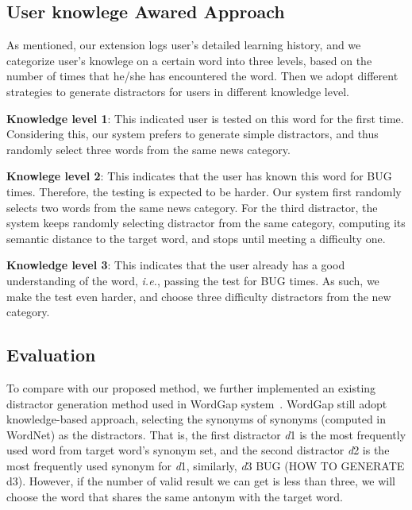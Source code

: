\subsection{User knowlege Awared Approach}
As mentioned, our extension logs user's detailed learning history, and we categorize user's knowlege  on a certain word into three levels, based on the number of times that he/she has encountered  the word.  Then we adopt different strategies to generate  distractors for users in different knowledge level. 



{\bf Knowledge level 1}: This indicated user is tested on this word for the first time. Considering this, our system prefers to generate simple distractors, and thus randomly select three words from the same news category. 

{\bf Knowlege level 2}: This indicates that the user has known this word for BUG times. Therefore, the testing is expected to be harder. Our system first randomly selects two words from the same news category. For the third distractor,  the system keeps randomly selecting distractor from the same category, computing its semantic distance to the target word, and stops until meeting a difficulty one.


{\bf Knowledge level 3}: This indicates that the user already has a good understanding of the word, {\it i.e.}, passing the test for BUG times. As such, we make the test even harder, and choose  three difficulty distractors from the new category. 



\subsection{Evaluation}
To compare with our proposed method, we further implemented an existing distractor generation method  used in WordGap system~\cite{Knoop2013}. WordGap still adopt knowledge-based approach, selecting the synonyms of synonyms (computed in WordNet) as the distractors. That is, the first distractor {\textit d1} is the most frequently used word from target word’s synonym set, and the second distractor {\textit d2} is the most frequently used synonym for  {\textit d1},
similarly, {\textit d3} BUG (HOW TO GENERATE d3). However, if the number of valid result we can get is less than three, we will choose the word that shares the same antonym with the target word.

